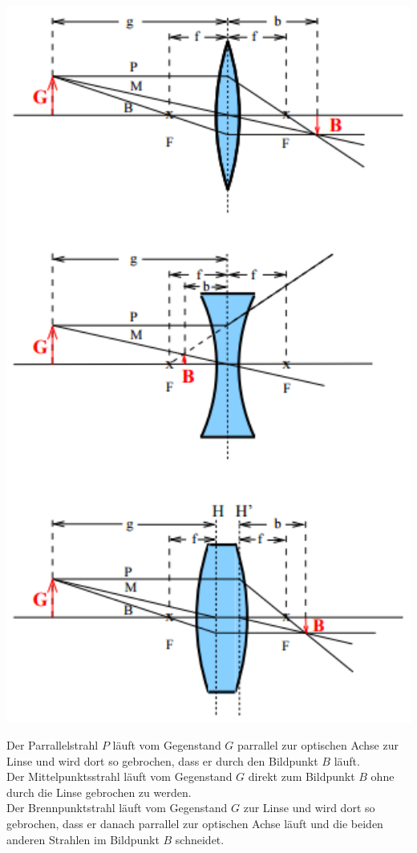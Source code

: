\begin{minipage}[T]{0.5\textwidth}
\includegraphics[width=1\textwidth]{picture/Bild1.PNG}
\label{fig:Bild1}
\end{minipage}
Der Parrallelstrahl $P$ läuft vom Gegenstand $G$ parrallel zur optischen Achse zur Linse und wird dort so gebrochen, dass er durch den Bildpunkt $B$ läuft. \\
Der Mittelpunktsstrahl läuft vom Gegenstand $G$ direkt zum Bildpunkt $B$ ohne durch die Linse gebrochen zu werden.\\
Der Brennpunktstrahl läuft vom Gegenstand $G$ zur Linse und wird dort so gebrochen, dass er danach parrallel zur optischen Achse läuft und die beiden anderen Strahlen im Bildpunkt $B$ schneidet.
\newpage

